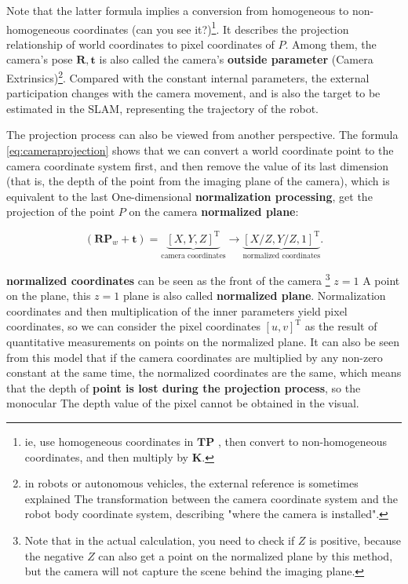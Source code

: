 Note that the latter formula implies a conversion from homogeneous to non-homogeneous coordinates (can you see it?)\footnote{ie, use homogeneous coordinates in $\bm{T}\bm{P}$ , then convert to non-homogeneous coordinates, and then multiply by $\bm{K}$. }. It describes the projection relationship of world coordinates to pixel coordinates of $P$. Among them, the camera's pose $\bm{R}, \bm{t}$ is also called the camera's \textbf{outside parameter} (Camera Extrinsics)\footnote{in robots or autonomous vehicles, the external reference is sometimes explained The transformation between the camera coordinate system and the robot body coordinate system, describing "where the camera is installed". }. Compared with the constant internal parameters, the external participation changes with the camera movement, and is also the target to be estimated in the SLAM, representing the trajectory of the robot.

The projection process can also be viewed from another perspective. The formula \eqref{eq:cameraprojection} shows that we can convert a world coordinate point to the camera coordinate system first, and then remove the value of its last dimension (that is, the depth of the point from the imaging plane of the camera), which is equivalent to the last One-dimensional \textbf{normalization processing}, get the projection of the point $P$ on the camera \textbf{normalized plane}:

\begin{equation}
\left( {\bm{R}{\bm{P}_w} + \bm{t}} \right) = \underbrace{\left[ X,Y,Z\right]^\mathrm{T}}_{\text{camera coordinates}} \to \underbrace {\left[ {X/Z,Y/Z,1} \right]^\mathrm{T}}_{\text{normalized coordinates}}.
\end{equation}

\textbf{normalized coordinates} can be seen as the front of the camera \footnote{Note that in the actual calculation, you need to check if $Z$ is positive, because the negative $Z$ can also get a point on the normalized plane by this method, but the camera will not capture the scene behind the imaging plane.} $z=1$ A point on the plane, this $z=1$ plane is also called \textbf{normalized plane}. Normalization coordinates and then multiplication of the inner parameters yield pixel coordinates, so we can consider the pixel coordinates $[u,v]^\mathrm{T}$ as the result of quantitative measurements on points on the normalized plane. It can also be seen from this model that if the camera coordinates are multiplied by any non-zero constant at the same time, the normalized coordinates are the same, which means that the depth of \textbf{point is lost during the projection process}, so the monocular The depth value of the pixel cannot be obtained in the visual.
